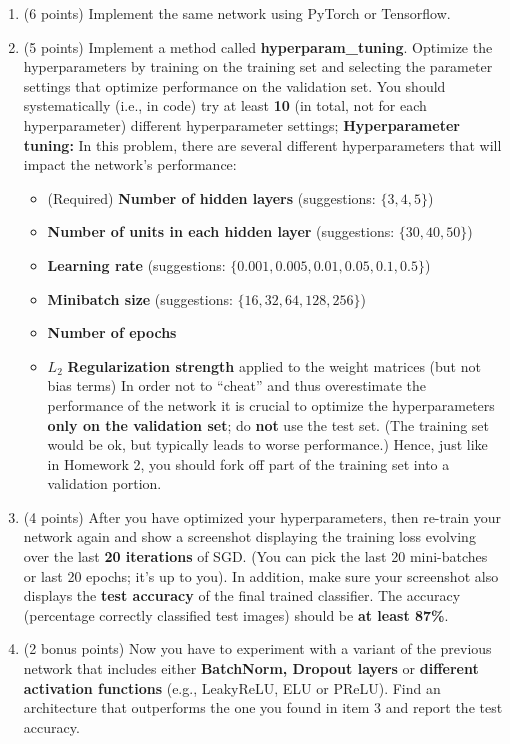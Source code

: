 \documentclass[
  letterpaper,
  DIV=11,
  numbers=noendperiod]{scrartcl}
\providecommand{\tightlist}{%
  \setlength{\itemsep}{0pt}\setlength{\parskip}{0pt}}\usepackage{longtable,booktabs,array}
\begin{document}
\begin{enumerate}
\def\labelenumi{\arabic{enumi}.}
\item
  (6 points) Implement the same network using PyTorch or Tensorflow.
\item
  (5 points) Implement a method called \textbf{hyperparam\_tuning}.
  Optimize the hyperparameters by training on the training set and
  selecting the parameter settings that optimize performance on the
  validation set. You should systematically (i.e., in code) try at least
  \textbf{10} (in total, not for each hyperparameter) different
  hyperparameter settings; \textbf{Hyperparameter tuning:} In this
  problem, there are several different hyperparameters that will impact
  the network's performance:

  \begin{itemize}
  \tightlist
  \item
    (Required) \textbf{Number of hidden layers} (suggestions:
    \(\{3,4,5\}\))
  \item
    \textbf{Number of units in each hidden layer} (suggestions:
    \(\{30,40,50\}\))
  \item
    \textbf{Learning rate} (suggestions:
    \(\{0.001, 0.005, 0.01, 0.05, 0.1, 0.5\}\))
  \item
    \textbf{Minibatch size} (suggestions: \(\{16,32, 64, 128, 256\}\))
  \item
    \textbf{Number of epochs}
  \item
    \(L_{2}\) \textbf{Regularization strength} applied to the weight
    matrices (but not bias terms) In order not to ``cheat'' and thus
    overestimate the performance of the network it is crucial to
    optimize the hyperparameters \textbf{only on the validation set}; do
    \textbf{not} use the test set. (The training set would be ok, but
    typically leads to worse performance.) Hence, just like in Homework
    2, you should fork off part of the training set into a validation
    portion.
  \end{itemize}
\item
  (4 points) After you have optimized your hyperparameters, then
  re-train your network again and show a screenshot displaying the
  training loss evolving over the last \textbf{20 iterations} of SGD.
  (You can pick the last 20 mini-batches or last 20 epochs; it's up to
  you). In addition, make sure your screenshot also displays the
  \textbf{test accuracy} of the final trained classifier. The accuracy
  (percentage correctly classified test images) should be \textbf{at
  least 87\%}.
\item
  (2 bonus points) Now you have to experiment with a variant of the
  previous network that includes either \textbf{BatchNorm, Dropout
  layers} or \textbf{different activation functions} (e.g., LeakyReLU,
  ELU or PReLU). Find an architecture that outperforms the one you found
  in item 3 and report the test accuracy.
\end{enumerate}
\end{document}
